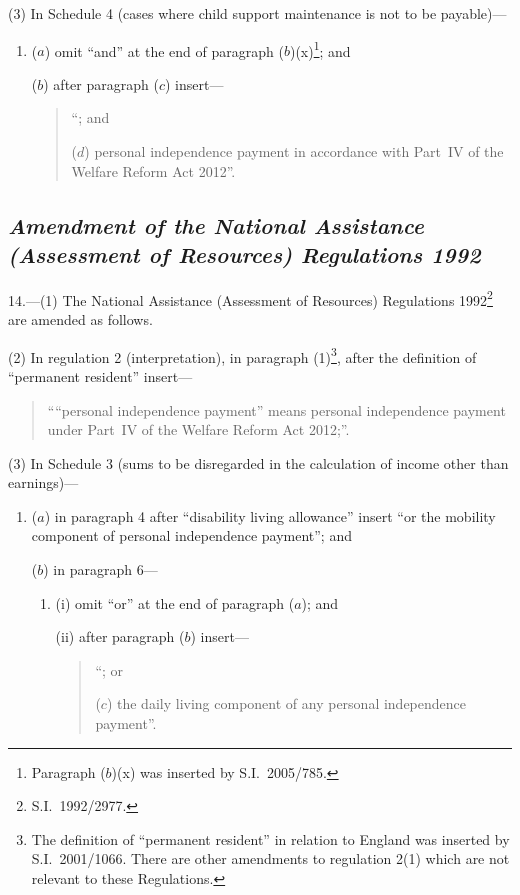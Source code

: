 \documentclass[12pt,a4paper]{article}
\begin{document}
(3) In Schedule 4 (cases where child support maintenance is not to be payable)—
\begin{enumerate}\item[]
($a$) omit “and” at the end of paragraph ($b$)(x)\footnote{Paragraph ($b$)(x) was inserted by S.I.~2005/785.}; and

($b$) after paragraph ($c$)  insert—
\begin{quotation}
“; and

($d$) personal independence payment in accordance with Part~IV of the Welfare Reform Act 2012”.
\end{quotation}
\end{enumerate}

\subsection*{\itshape Amendment of the National Assistance (Assessment of Resources) Regulations 1992}

14.—(1) The National Assistance (Assessment of Resources) Regulations 1992\footnote{S.I.~1992/2977.} are amended as follows.

(2) In regulation 2 (interpretation), in paragraph (1)\footnote{The definition of “permanent resident” in relation to England was inserted by S.I.~2001/1066. There are other amendments to regulation 2(1) which are not relevant to these Regulations.}, after the definition of “permanent resident” insert—
\begin{quotation}
““personal independence payment” means personal independence payment under Part~IV of the Welfare Reform Act 2012;”.
\end{quotation}

(3) In Schedule 3 (sums to be disregarded in the calculation of income other than earnings)—
\begin{enumerate}\item[]
($a$) in paragraph 4 after “disability living allowance” insert “or the mobility component of personal independence payment”; and

($b$) in paragraph 6—
\begin{enumerate}\item[]
(i) omit “or” at the end of paragraph ($a$); and

(ii) after paragraph ($b$)  insert—
\begin{quotation}
“; or

($c$) the daily living component of any personal independence payment”.
\end{quotation}
\end{enumerate}
\end{enumerate}
\end{document}
